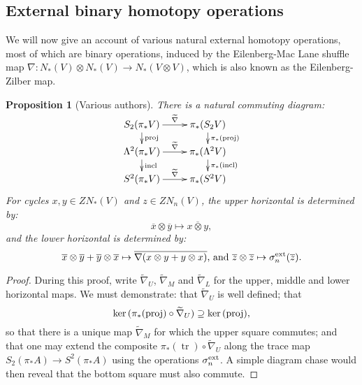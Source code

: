 \documentclass[11pt]{amsart}
\theoremstyle{plain}
\newtheorem{prop}[thm]{Proposition}
\theoremstyle{definition}
\renewcommand{\ker}{\textup{ker}\,}
\DeclareMathOperator{\trace}{tr}
\renewcommand{\to}{\longrightarrow}
\newcommand{\calV}{\mathcal{V}}
\theoremstyle{plain}
\newcommand{\vect}[2]{\calV^{#1}_{#2}}
\begin{document}
\begin{Constructing (co)homotopy operations}
\subsection{External binary homotopy operations}
We will now give an account of various natural external homotopy operations, most of which are binary operations, induced by the  Eilenberg-Mac Lane shuffle map $\nabla:N_*(V)\otimes N_*(V)\to N_*(V\otimes V)$, which is also known as the Eilenberg-Zilber map.
\begin{prop}[Various authors]\label{the top external homotopy operations}
There is a natural commuting diagram:
\[\xymatrix@R=4mm{
S_2(\pi_*V)\ar[r]^-{\smash{\widetilde{\nabla}}}
\ar[d]^-{\textup{proj}}
&%
\pi_*(S_2V)\ar[d]^-{\pi_*(\textup{proj})}
\\%
\Lambda^2(\pi_*V)\ar[r]^-{\widetilde{\nabla}}
\ar[d]^-{\textup{incl}}
&%
\pi_*(\Lambda^2V)\ar[d]^-{\pi_*(\textup{incl})}
\\%
S^2(\pi_*V)\ar[r]^-{\widetilde{\nabla}}&%
\pi_*(S^2V)%
}\]
For cycles $x,y\in ZN_*(V)$ and $z\in ZN_n(V)$, the upper horizontal is determined by:
\[\overline{x}\otimes\overline{y}\mapsto \overline{x\otimes y},\]
and the lower horizontal is determined by:
\[\overline{x}\otimes\overline{y}+\overline{y}\otimes \overline{x}\mapsto\overline{\nabla(x\otimes y+y\otimes x)}\textup{, and }\overline{z}\otimes\overline{z}\mapsto\sigma^\textup{ext}_n(\overline{z}).\]
\end{prop}
\begin{proof}
During this proof, write $\widetilde{\nabla}_U$, $\widetilde{\nabla}_M$ and $\widetilde{\nabla}_L$ for the upper, middle and lower horizontal maps. We must demonstrate: that $\widetilde{\nabla}_U$  is well defined; that
\[\ker(\pi_*(\textup{proj})\circ\widetilde{\nabla}_U)\supseteq\ker(\textup{proj}),\]
so that there is a unique map $\widetilde{\nabla}_M$ for which the upper square commutes; and that one may extend the composite $\pi_*(\trace)\circ\widetilde{\nabla}_U$ along the trace map $S_2(\pi_*A)\to S^2(\pi_*A)$ using the operations
$\sigma_n^\textup{ext}$.
A simple diagram chase would then reveal that the bottom square must also commute.


\end{proof}
\end{Constructing (co)homotopy operations}
\end{document}
